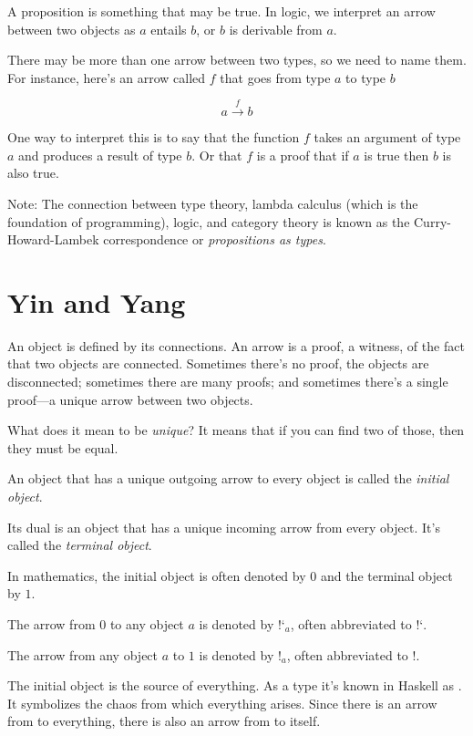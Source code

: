 \documentclass[DaoFP]{subfiles}
\begin{document}
A proposition is something that may be true. In logic, we interpret an arrow between two objects as $a$ entails $b$, or $b$ is derivable from $a$. 
\pagebreak

There may be more than one arrow between two types, so we need to name them. For instance, here's an arrow called $f$ that goes from type $a$ to type $b$

\[ a \xrightarrow f b \]

One way to interpret this is to say that the function $ f$ takes an argument of type $a$ and produces a result of type $b$. Or that $ f$ is a proof that if $a$ is true then $b$ is also true.



Note: The connection between type theory, lambda calculus (which is the foundation of programming), logic, and category theory is known as the Curry-Howard-Lambek correspondence or \emph{propositions as types}.

\section{Yin and Yang}

An object is defined by its connections. An arrow is a proof, a witness, of the fact that two objects are connected. Sometimes there's no proof, the objects are disconnected; sometimes there are many proofs; and sometimes there's a single proof---a unique arrow between two objects.

What does it mean to be \emph{unique}? It means that if you can find two of those, then they must be equal.

An object that has a unique outgoing arrow to every object is called the \emph{initial object}.

Its dual is an object that has a unique incoming arrow from every object. It's called the \emph{terminal object}. 

In mathematics, the initial object is often denoted by $0$ and the terminal object by $1$.

The arrow from $0$ to any object $a$ is denoted by $\mbox{!`}_a$, often abbreviated to $\mbox{!`}$.

The arrow from any object $a$ to $1$ is denoted by $!_a$, often abbreviated to $!$.

The initial object is the source of everything. As a type it's known in Haskell as . It symbolizes the chaos from which everything arises. Since there is an arrow from  to everything, there is also an arrow from  to itself. 
\end{document}
